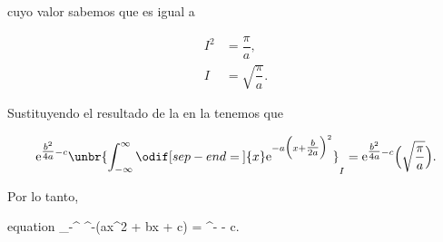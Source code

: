 \documentclass[../main.tex]{subfiles}
\begin{document}
\begin{problema}
	cuyo valor sabemos que es igual a

	\begin{align}
		I^{2} & = \dfrac{\pi}{a},\nonumber                   \\
		I     & = \sqrt{\dfrac{\pi}{a}}.\label{eq:int_value}
	\end{align}

	Sustituyendo el resultado de la  en la
	 tenemos que

	\begin{equation*}
		\mathrm{e}^{\tfrac{b^{2}}{4a} - c}\unbr{\int_{-\infty}^{\infty}\odif[sep-end=\medspace]{x} \mathrm{e}^{-a \Bigl(x + \tfrac{b}{2a}\Bigr)^{2}}}_{I} = \mathrm{e}^{\tfrac{b^{2}}{4a} - c}\Bigl(\sqrt{\dfrac{\pi}{a}}\Bigr).
	\end{equation*}

	Por lo tanto,

	\begin{empheq}[box = \mainresult]{equation}
		\int_{-\infty}^{\infty} ^{-(ax^{2} + bx + c)} =
		^{- - c}.
		\label{eq:integral_quadratic_polynomial}
	\end{empheq}
\end{problema}
\end{document}
